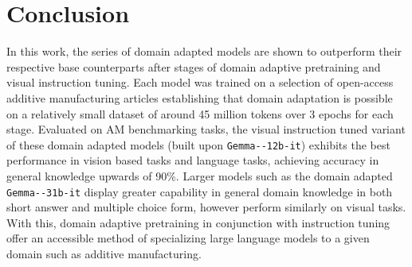 \section{Conclusion}
In this work, the series of domain adapted models are shown to outperform their
respective base counterparts after stages of domain adaptive pretraining and
visual instruction tuning. Each model was trained on a selection of open-access
additive manufacturing articles establishing that domain adaptation is possible
on a relatively small dataset of around 45 million tokens over 3 epochs for each
stage. Evaluated on AM benchmarking tasks, the visual instruction tuned variant
of these domain adapted models (built upon \texttt{Gemma--\allowbreak 12b-\allowbreak it}) exhibits the best performance in vision based
tasks and language tasks, achieving accuracy in general knowledge upwards of
90\%. Larger models such as the domain adapted \texttt{Gemma--\allowbreak 31b-\allowbreak it} display greater capability in general domain
knowledge in both short answer and multiple choice form, however perform
similarly on visual tasks. With this, domain adaptive pretraining in conjunction
with instruction tuning offer an accessible method of specializing large
language models to a given domain such as additive manufacturing.



